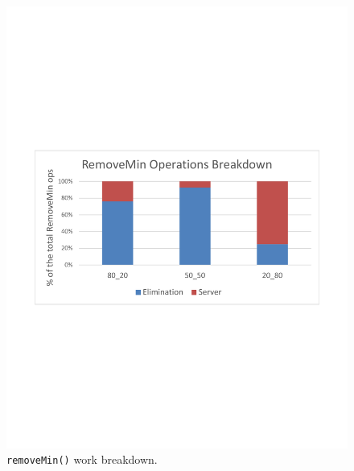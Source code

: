 \begin{figure}[htb]
\begin{minipage}[b]{.495\textwidth}
  \includegraphics[width=\linewidth]{img/sparc-rem-brk.pdf}
\caption{\texttt{removeMin()} work breakdown.}
\label{fig:sparc_rem}
\end{minipage}%
\end{figure}

